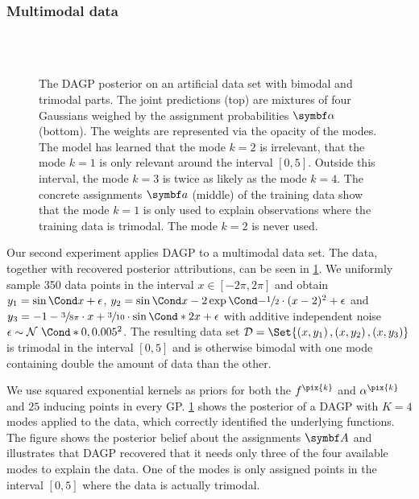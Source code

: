 \subsubsection{Multimodal data}
\label{toc:data_association:semi_bimodal}
%
\begin{figure}[tp]
    \centering
    \\%
    \vspace{\figureskip}%
    \\%
    \vspace{\figureskip}%
    \caption[DAGP multimodality experiment]{
        \label{fig:data_association:semi_bimodal}
        The DAGP posterior on an artificial data set with bimodal and trimodal parts.
        The joint predictions (top) are mixtures of four Gaussians weighed by the assignment probabilities $\mat{\alpha}$ (bottom).
        The weights are represented via the opacity of the modes.
        The model has learned that the mode $k = 2$ is irrelevant, that the mode $k = 1$ is only relevant around the interval $[0, 5]$.
        Outside this interval, the mode $k = 3$ is twice as likely as the mode $k = 4$.
        The concrete assignments $\mat{a}$ (middle) of the training data show that the mode $k = 1$ is only used to explain observations where the training data is trimodal.
        The mode $k = 2$ is never used.
    }
\end{figure}
%
Our second experiment applies DAGP to a multimodal data set.
The data, together with recovered posterior attributions, can be seen in \cref{fig:data_association:semi_bimodal}.
We uniformly sample 350 data points in the interval $x \in [-2\pi, 2\pi]$ and obtain $y_1 = \Fun{\sin}{x} + \epsilon$, $y_2 = \Fun{\sin}{x} - 2 \Fun{\exp}{-\sfrac{1}{2} \cdot (x-2)^2} + \epsilon$ and $y_3 = -1 - \sfrac{3}{8\pi} \cdot x + \sfrac{3}{10} \cdot \Fun*{\sin}{2x} + \epsilon$ with additive independent noise $\epsilon \sim \Gaussian*{0, 0.005^2}$.
The resulting data set $\Dc = \Set{\left( x, y_1 \right), \left( x, y_2 \right), \left( x, y_3 \right)}$ is trimodal in the interval $[0, 5]$ and is otherwise bimodal with one mode containing double the amount of data than the other.

We use squared exponential kernels as priors for both the $f^{\pix{k}}$ and $\alpha^{\pix{k}}$ and $25$ inducing points in every GP.
\cref{fig:data_association:semi_bimodal} shows the posterior of a DAGP with $K = 4$ modes applied to the data, which correctly identified the underlying functions.
The figure shows the posterior belief about the assignments $\mat{A}$ and illustrates that DAGP recovered that it needs only three of the four available modes to explain the data.
One of the modes is only assigned points in the interval $[0, 5]$ where the data is actually trimodal.

